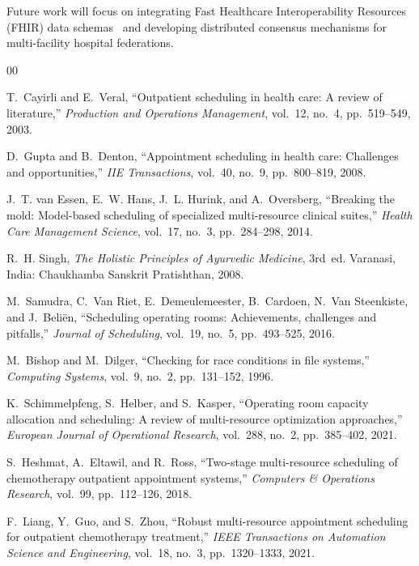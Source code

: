 \documentclass[conference]{IEEEtran}
\begin{document}
Future work will focus on integrating Fast Healthcare Interoperability Resources (FHIR) data schemas~\cite{bender2013hl7} and developing distributed consensus mechanisms for multi-facility hospital federations.

\begin{thebibliography}{00}

T.~Cayirli and E.~Veral, ``Outpatient scheduling in health care: A review of literature,'' \emph{Production and Operations Management}, vol.~12, no.~4, pp.~519--549, 2003.

D.~Gupta and B.~Denton, ``Appointment scheduling in health care: Challenges and opportunities,'' \emph{IIE Transactions}, vol.~40, no.~9, pp.~800--819, 2008.

J.~T. van Essen, E.~W. Hans, J.~L. Hurink, and A.~Oversberg, ``Breaking the mold: Model-based scheduling of specialized multi-resource clinical suites,'' \emph{Health Care Management Science}, vol.~17, no.~3, pp.~284--298, 2014.

R.~H. Singh, \emph{The Holistic Principles of Ayurvedic Medicine}, 3rd~ed. Varanasi, India: Chaukhamba Sanskrit Pratishthan, 2008.

M.~Samudra, C.~Van Riet, E.~Demeulemeester, B.~Cardoen, N.~Van Steenkiste, and J.~Beli{\"e}n, ``Scheduling operating rooms: Achievements, challenges and pitfalls,'' \emph{Journal of Scheduling}, vol.~19, no.~5, pp.~493--525, 2016.

M.~Bishop and M.~Dilger, ``Checking for race conditions in file systems,'' \emph{Computing Systems}, vol.~9, no.~2, pp.~131--152, 1996.

K.~Schimmelpfeng, S.~Helber, and S.~Kasper, ``Operating room capacity allocation and scheduling: A review of multi-resource optimization approaches,'' \emph{European Journal of Operational Research}, vol.~288, no.~2, pp.~385--402, 2021.

S.~Heshmat, A.~Eltawil, and R.~Ross, ``Two-stage multi-resource scheduling of chemotherapy outpatient appointment systems,'' \emph{Computers \& Operations Research}, vol.~99, pp.~112--126, 2018.

F.~Liang, Y.~Guo, and S.~Zhou, ``Robust multi-resource appointment scheduling for outpatient chemotherapy treatment,'' \emph{IEEE Transactions on Automation Science and Engineering}, vol.~18, no.~3, pp.~1320--1333, 2021.


\end{thebibliography}
\end{document}
